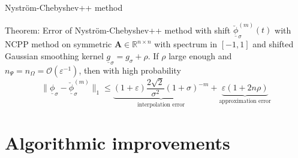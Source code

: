 \documentclass[aspectratio=169, leqno, 12pt]{beamer}
\newcommand{\mtx}[1]{\boldsymbol{#1}}
\begin{document}
\begin{frame}{Nystr\"om-Chebyshev++ method}
    \begin{block}{Theorem: Error of Nystr\"om-Chebyshev++ method with shift}
        $\underline{\breve{\phi}}_{\sigma}^{(m)}(t)$ with \gls{NCPP} method
        on symmetric $\mtx{A} \in \mathbb{R}^{n \times n}$ with spectrum in $[-1, 1]$
        and shifted Gaussian smoothing kernel $\underline{g}_{\sigma}=g_{\sigma} + \rho$.
        If $\rho$ large enough and $n_{\Psi} = n_{\Omega} = \mathcal{O}(\varepsilon^{-1})$,
        then with high probability
        \begin{equation}
            \lVert \underline{\phi}_{\sigma} - \breve{\underline{\phi}}_{\sigma}^{(m)} \rVert _1
            \leq \underbrace{(1 + \varepsilon) \frac{2\sqrt{2}}{\sigma^2} (1 + \sigma)^{-m}}_{\text{interpolation error}}
            + \underbrace{\varepsilon(1 + 2 n \rho)}_{\text{approximation error}}
        \end{equation}
    \end{block}
\end{frame}


\section{Algorithmic improvements}
\end{document}
